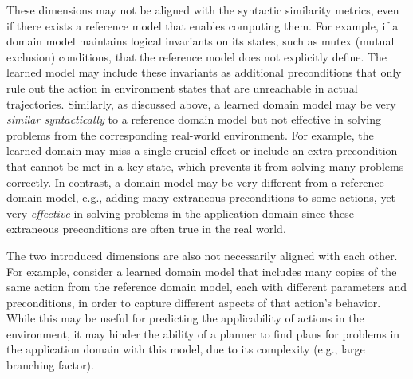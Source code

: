 \documentclass[letterpaper]{article} %
\newif\ifaddcomments
\newcommand{\roni}[1]{\ifaddcomments{\textcolor{red}{[Roni: #1]}}\fi}
\newcommand{\yarin}[1]{\ifaddcomments{\textcolor{teal}{[Yarin: #1]}}\fi}
\newcommand{\gregor}[1]{\ifaddcomments{\textcolor{orange}{[Gregor: #1]}}\fi}
\begin{document}
These dimensions may not be aligned with the syntactic similarity metrics, even if there exists a reference model that enables computing them.  
For example, if a domain model maintains logical invariants on its states, such as mutex (mutual exclusion) conditions, that the reference model does not explicitly define. The learned model may include these invariants as additional preconditions that only rule out the action in environment states that are unreachable in actual trajectories.
Similarly, as discussed above, a learned domain model may be very \emph{similar syntactically} to a reference domain model but not effective in solving problems from the corresponding real-world environment. 
For example, the learned domain may miss a single crucial effect or include an extra precondition that cannot be met in a key state, which prevents it from solving many problems correctly. 
In contrast, a domain model may be very different from a reference domain model, e.g., adding many extraneous preconditions to some actions, yet very \emph{effective} in solving problems in the application domain since these extraneous preconditions are often true in the real world. 


The two introduced dimensions are also not necessarily aligned with each other. %
For example, consider a learned domain model that includes many copies of the same action from the reference domain model, each with different parameters and preconditions, in order to capture different aspects of that action's behavior. 
While this may be useful for predicting the applicability of actions in the environment, 
it may hinder the ability of a planner to find plans for problems in the application domain with this model, due to its complexity (e.g., large branching factor). 
\end{document}
